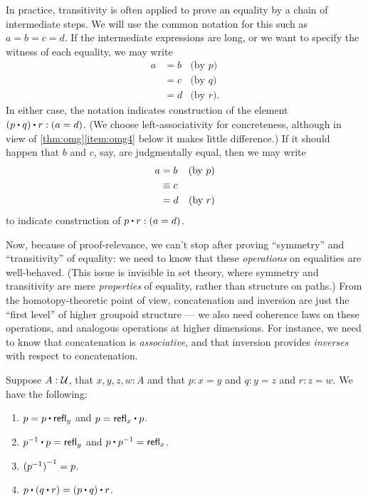 In practice, transitivity is often applied to prove an equality by a chain of intermediate steps.
We will use the common notation for this such as $a=b=c=d$.
If the intermediate expressions are long, or we want to specify the witness of each equality, we may write
\begin{align*}
  a &= b & \text{(by $p$)}\\ &= c &\text{(by $q$)} \\ &= d &\text{(by $r$)}.
\end{align*}
In either case, the notation indicates construction of the element $(p\ct q)\ct r: (a=d)$.
(We choose left-associativity for concreteness, although in view of \autoref{thm:omg}\ref{item:omg4} below it makes little difference.)
If it should happen that $b$ and $c$, say, are judgmentally equal, then we may write
\begin{align*}
  a &= b & \text{(by $p$)}\\ &\equiv c \\ &= d &\text{(by $r$)}
\end{align*}
to indicate construction of $p\ct r : (a=d)$.

Now, because of proof-relevance, we can't stop after proving ``symmetry'' and ``transitivity'' of equality: we need to know that these \emph{operations} on equalities are well-behaved.
(This issue is invisible in set theory, where symmetry and transitivity are mere \emph{properties} of equality, rather than structure on
paths.)
From the homotopy-theoretic point of view, concatenation and inversion are just the ``first level'' of higher groupoid structure --- we also need coherence laws on these operations, and analogous operations at higher dimensions.
For instance, we need to know that concatenation is \emph{associative}, and that inversion provides \emph{inverses} with respect to concatenation.

\begin{lem}\label{thm:omg}%
  Suppose $A:\mathcal{U}$, that $x,y,z,w:A$ and that $p:x= y$ and $q:y = z$ and $r:z=w$.
  We have the following:
  \begin{enumerate}
  \item $p= p\ct \refl{y}$ and $p = \refl{x} \ct p$.\label{item:omg1}
  \item $\opp{p}\ct p=  \refl{y}$ and $p\ct \opp{p}= \refl{x}$.
  \item $\mathord{{(\mathord{{p}^{-1}})}^{-1}}= p$.
  \item $p\ct (q\ct r)=  (p\ct q)\ct r$.\label{item:omg4}
  \end{enumerate}
\end{lem}

